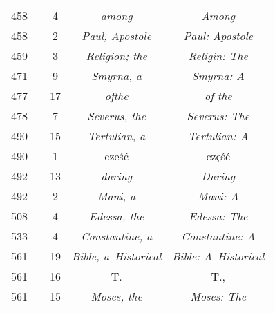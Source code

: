 \documentclass[a4paper,11pt]{article}
\begin{document}
\begin{center}
\begin{tabular}{|c|c|c|c|c|}
    458 & &  4 & \textit{among} & \textit{Among} \\
    458 & &  2 & \textit{Paul, Apostole} & \textit{Paul: Apostole} \\
    459 & &  3 & \textit{Religion; the} & \textit{Religin: The} \\
    471 & &  9 & \textit{Smyrna, a} & \textit{Smyrna: A} \\
    477 & & 17 & \textit{ofthe} & \textit{of the} \\
    478 & &  7 & \textit{Severus, the} & \textit{Severus: The} \\
    490 & & 15 & \textit{Tertulian, a} & \textit{Tertulian: A} \\
    490 & &  1 & cześć & część \\
    492 & & 13 & \textit{during} & \textit{During} \\
    492 & &  2 & \textit{Mani, a} & \textit{Mani: A} \\
    508 & &  4 & \textit{Edessa, the} & \textit{Edessa: The} \\
    533 & &  4 & \textit{Constantine, a} & \textit{Constantine: A} \\
    561 & & 19 & \textit{Bible, a~Historical}
           & \textit{Bible: A~Historical} \\
    561 & & 16 & T. & T., \\
    561 & & 15 & \textit{Moses, the} & \textit{Moses: The} \\
    \hline
  \end{tabular}





  \newpage


\end{center}
\end{document}
